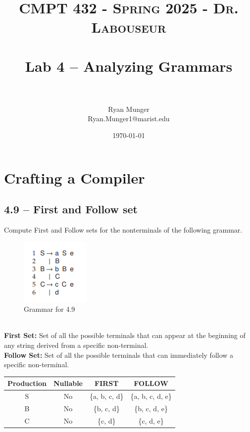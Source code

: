 \documentclass[letterpaper, 10pt]{article}
\title{	
   \normalfont \normalsize 
   \textsc{CMPT 432 - Spring 2025 - Dr. Labouseur} \\[10pt] %
   \horrule{0.5pt} \\[0.25cm] 	%
   \huge Lab 4 -- Analyzing Grammars \\     	    %
   \horrule{0.5pt} \\[0.25cm] 	%
}
\author{Ryan Munger \\ \normalsize Ryan.Munger1@marist.edu}
\date{\normalsize\today} 	%
\begin{document}
\maketitle %


\section{Crafting a Compiler}
\subsection{4.9	-- First and Follow set}
Compute First and Follow sets for the nonterminals of the following grammar.
\begin{figure} [h]
    \centering
    \includegraphics[width=0.3\linewidth]{4-9_grammar.png}
    \caption{Grammar for 4.9}
    \label{fig:enter-label}
\end{figure} \\
\textbf{First Set:} Set of all the possible terminals that can appear at the beginning of any string derived from a specific non-terminal. \\
\textbf{Follow Set:} Set of all the possible terminals that can immediately follow a specific non-terminal.
\begin{center}
\begin{table}[h]
\begin{tabular}{|c|c|c|c|}
\hline
\textbf{Production} & \textbf{Nullable} & \textbf{FIRST} & \textbf{FOLLOW} \\
\hline
    S & No & \{a, b, c, d\} & \{a, b, c, d, e\} \\
    B & No & \{b, c, d\} & \{b, c, d, e\} \\
    C & No & \{c, d\} & \{c, d, e\}\\
\hline
\end{tabular}
\end{table}
\end{center}
\end{document}
